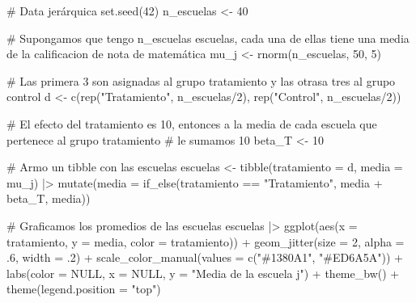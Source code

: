 \documentclass[
  letterpaper,
  DIV=11,
  numbers=noendperiod,
  oneside]{scrreprt}
\newenvironment{Shaded}{\begin{snugshade}}{\end{snugshade}}
\newcommand{\AttributeTok}[1]{\textcolor[rgb]{0.40,0.45,0.13}{#1}}
\newcommand{\CommentTok}[1]{\textcolor[rgb]{0.37,0.37,0.37}{#1}}
\newcommand{\ConstantTok}[1]{\textcolor[rgb]{0.56,0.35,0.01}{#1}}
\newcommand{\DecValTok}[1]{\textcolor[rgb]{0.68,0.00,0.00}{#1}}
\newcommand{\FunctionTok}[1]{\textcolor[rgb]{0.28,0.35,0.67}{#1}}
\newcommand{\NormalTok}[1]{\textcolor[rgb]{0.00,0.23,0.31}{#1}}
\newcommand{\OtherTok}[1]{\textcolor[rgb]{0.00,0.23,0.31}{#1}}
\newcommand{\SpecialCharTok}[1]{\textcolor[rgb]{0.37,0.37,0.37}{#1}}
\newcommand{\StringTok}[1]{\textcolor[rgb]{0.13,0.47,0.30}{#1}}
\begin{document}
\begin{Shaded}
\begin{Highlighting}[]
\CommentTok{\# Data jerárquica}
\FunctionTok{set.seed}\NormalTok{(}\DecValTok{42}\NormalTok{)}
\NormalTok{n\_escuelas }\OtherTok{\textless{}{-}} \DecValTok{40}

\CommentTok{\# Supongamos que tengo n\_escuelas escuelas, cada una de ellas tiene una media de la calificacion de nota de matemática}
\NormalTok{mu\_j }\OtherTok{\textless{}{-}} \FunctionTok{rnorm}\NormalTok{(n\_escuelas, }\DecValTok{50}\NormalTok{, }\DecValTok{5}\NormalTok{)}
  
\CommentTok{\# Las primera 3 son asignadas al grupo tratamiento y las otrasa tres al grupo control}
\NormalTok{d }\OtherTok{\textless{}{-}} \FunctionTok{c}\NormalTok{(}\FunctionTok{rep}\NormalTok{(}\StringTok{"Tratamiento"}\NormalTok{, n\_escuelas}\SpecialCharTok{/}\DecValTok{2}\NormalTok{), }\FunctionTok{rep}\NormalTok{(}\StringTok{"Control"}\NormalTok{,  n\_escuelas}\SpecialCharTok{/}\DecValTok{2}\NormalTok{))}

\CommentTok{\# El efecto del tratamiento es 10, entonces a la media de cada escuela que pertenece al grupo tratamiento}
\CommentTok{\# le sumamos 10}
\NormalTok{beta\_T }\OtherTok{\textless{}{-}} \DecValTok{10}

\CommentTok{\# Armo un tibble con las escuelas}
\NormalTok{escuelas }\OtherTok{\textless{}{-}} \FunctionTok{tibble}\NormalTok{(}\AttributeTok{tratamiento =}\NormalTok{ d, }\AttributeTok{media =}\NormalTok{ mu\_j) }\SpecialCharTok{|\textgreater{}}
    \FunctionTok{mutate}\NormalTok{(}\AttributeTok{media =} \FunctionTok{if\_else}\NormalTok{(tratamiento }\SpecialCharTok{==} \StringTok{"Tratamiento"}\NormalTok{, media }\SpecialCharTok{+}\NormalTok{ beta\_T, media)) }

\CommentTok{\# Graficamos los promedios de las escuelas}
\NormalTok{escuelas }\SpecialCharTok{|\textgreater{}}
  \FunctionTok{ggplot}\NormalTok{(}\FunctionTok{aes}\NormalTok{(}\AttributeTok{x =}\NormalTok{ tratamiento, }
             \AttributeTok{y =}\NormalTok{ media,}
             \AttributeTok{color =}\NormalTok{ tratamiento)) }\SpecialCharTok{+}
  \FunctionTok{geom\_jitter}\NormalTok{(}\AttributeTok{size =} \DecValTok{2}\NormalTok{, }
              \AttributeTok{alpha =}\NormalTok{ .}\DecValTok{6}\NormalTok{,}
              \AttributeTok{width =}\NormalTok{ .}\DecValTok{2}\NormalTok{) }\SpecialCharTok{+}
  \FunctionTok{scale\_color\_manual}\NormalTok{(}\AttributeTok{values =} \FunctionTok{c}\NormalTok{(}\StringTok{"\#1380A1"}\NormalTok{, }\StringTok{"\#ED6A5A"}\NormalTok{)) }\SpecialCharTok{+}
  \FunctionTok{labs}\NormalTok{(}\AttributeTok{color =} \ConstantTok{NULL}\NormalTok{, }\AttributeTok{x =} \ConstantTok{NULL}\NormalTok{, }\AttributeTok{y =} \StringTok{"Media de la escuela j"}\NormalTok{) }\SpecialCharTok{+}
  \FunctionTok{theme\_bw}\NormalTok{() }\SpecialCharTok{+}
  \FunctionTok{theme}\NormalTok{(}\AttributeTok{legend.position =} \StringTok{"top"}\NormalTok{)}
\end{Highlighting}
\end{Shaded}
\end{document}
